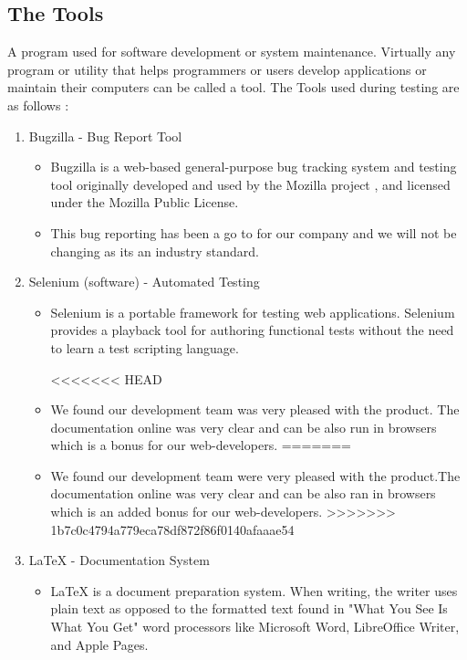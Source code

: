 \subsection{The Tools}


A program used for software development or system maintenance. Virtually any program
or utility that helps programmers
or users develop applications or maintain their computers can be called a tool.
The Tools used during testing are as follows :

\begin{enumerate}
   \item Bugzilla - Bug Report Tool
   \begin{itemize}
     \item Bugzilla is a web-based general-purpose bug tracking system and testing tool originally developed and used by the Mozilla project
     , and licensed under the Mozilla Public License.

      \item This bug reporting has been a go to for our company and we will not be changing as its an industry standard.
   \end{itemize}
   \item Selenium (software) - Automated Testing
   \begin{itemize}
     \item Selenium is a portable framework for testing web applications. Selenium provides a playback tool for authoring
      functional tests without the need to learn a test scripting language.

<<<<<<< HEAD
         \item We found our development team was very pleased with the product. The documentation online was very clear and can be also run in browsers which is a bonus for our web-developers.
=======
         \item We found our development team were very pleased with the product.The documentation online was very clear and can be also ran in browsers which is an added bonus for our  web-developers.
>>>>>>> 1b7c0c4794a779eca78df872f86f0140afaaae54
   \end{itemize}

   \item  LaTeX - Documentation System
   \begin{itemize}
     \item LaTeX is a document preparation system. When writing, the writer uses plain text as opposed to the formatted text found in "What You See Is What You Get"
      word processors like Microsoft Word, LibreOffice Writer, and Apple Pages.



\end{itemize}
\end{enumerate}

